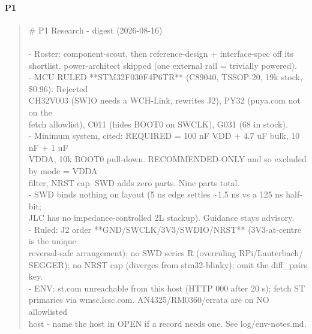 \documentclass[11pt,a4paper]{article}
\begin{document}
\paragraph*{P1}
\begin{quote}\small\ttfamily\raggedright
\# P1 Research - digest (2026-08-16)\\
~\\
- Roster: component-scout, then reference-design + interface-spec off its\\
  shortlist. power-architect skipped (one external rail = trivially powered).\\
- MCU RULED {*}{*}STM32F030F4P6TR{*}{*} (C89040, TSSOP-20, 19k stock, \$0.96). Rejected\\
  CH32V003 (SWIO needs a WCH-Link, rewrites J2), PY32 (puya.com not on the\\
  fetch allowlist), C011 (hides BOOT0 on SWCLK), G031 (68 in stock).\\
- Minimum system, cited: REQUIRED = 100 nF VDD + 4.7 uF bulk, 10 nF + 1 uF\\
  VDDA, 10k BOOT0 pull-down. RECOMMENDED-ONLY and so excluded by mode = VDDA\\
  filter, NRST cap. SWD adds zero parts. Nine parts total.\\
- SWD binds nothing on layout (5 ns edge settles \textasciitilde{}1.5 ns vs a 125 ns half-bit;\\
  JLC has no impedance-controlled 2L stackup). Guidance stays advisory.\\
- Ruled: J2 order {*}{*}GND/SWCLK/3V3/SWDIO/NRST{*}{*} (3V3-at-centre is the unique\\
  reversal-safe arrangement); no SWD series R (overruling RPi/Lauterbach/\\
  SEGGER); no NRST cap (diverges from stm32-blinky); omit the diff\_pairs key.\\
- ENV: st.com unreachable from this host (HTTP 000 after 20 s); fetch ST\\
  primaries via wmsc.lcsc.com. AN4325/RM0360/errata are on NO allowlisted\\
  host - name the host in OPEN if a record needs one. See log/env-notes.md.
\end{quote}
\end{document}
